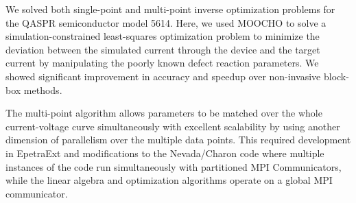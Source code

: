 \documentclass[pdf,ps2pdf,11pt]{SANDreport}
\begin{document}
We solved both single-point and multi-point inverse optimization problems for
the QASPR semiconductor model 5614.  Here, we used MOOCHO to solve a
simulation-constrained least-squares optimization problem to minimize the
deviation between the simulated current through the device and the target
current by manipulating the poorly known defect reaction parameters.  We showed
significant improvement in accuracy and speedup over non-invasive block-box
methods.





The multi-point algorithm allows parameters to be matched over the whole
current-voltage curve simultaneously with excellent scalability by using
another dimension of parallelism over the multiple data points.  This required
development in EpetraExt and modifications to the Nevada/Charon code where
multiple instances of the code run simultaneously with partitioned MPI
Communicators, while the linear algebra and optimization algorithms operate on
a global MPI communicator.


\end{document}
